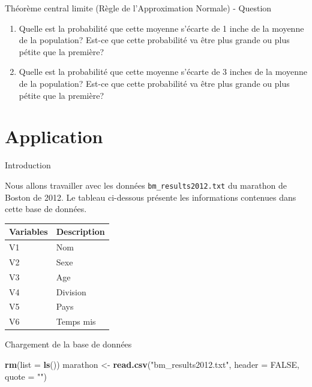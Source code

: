 \documentclass[ignorenonframetext,]{beamer}
\newenvironment{Shaded}{\begin{snugshade}}{\end{snugshade}}
\newcommand{\KeywordTok}[1]{\textcolor[rgb]{0.13,0.29,0.53}{\textbf{#1}}}
\newcommand{\DataTypeTok}[1]{\textcolor[rgb]{0.13,0.29,0.53}{#1}}
\newcommand{\StringTok}[1]{\textcolor[rgb]{0.31,0.60,0.02}{#1}}
\newcommand{\OtherTok}[1]{\textcolor[rgb]{0.56,0.35,0.01}{#1}}
\newcommand{\NormalTok}[1]{#1}
\providecommand{\tightlist}{%
  \setlength{\itemsep}{0pt}\setlength{\parskip}{0pt}}
\begin{document}
\begin{frame}{Théorème central limite (Règle de l'Approximation Normale)
- Question}

\begin{enumerate}
\def\labelenumi{\arabic{enumi}.}
\tightlist
\item
  Quelle est la probabilité que cette moyenne s'écarte de 1 inche de la
  moyenne de la population? Est-ce que cette probabilité va être plus
  grande ou plus pétite que la première?
\item
  Quelle est la probabilité que cette moyenne s'écarte de 3 inches de la
  moyenne de la population? Est-ce que cette probabilité va être plus
  grande ou plus pétite que la première?
\end{enumerate}

\end{frame}

\section{Application}\label{application}

\begin{frame}[fragile]{Introduction}

Nous allons travailler avec les données \texttt{bm\_results2012.txt} du
marathon de Boston de 2012. Le tableau ci-dessous présente les
informations contenues dans cette base de données.

\begin{longtable}[]{@{}ll@{}}
\toprule
Variables & Description\tabularnewline
\midrule
\endhead
V1 & Nom\tabularnewline
V2 & Sexe\tabularnewline
V3 & Age\tabularnewline
V4 & Division\tabularnewline
V5 & Pays\tabularnewline
V6 & Temps mis\tabularnewline
\bottomrule
\end{longtable}

\end{frame}

\begin{frame}[fragile]{Chargement de la base de données}

\begin{Shaded}
\begin{Highlighting}[]
\KeywordTok{rm}\NormalTok{(}\DataTypeTok{list =} \KeywordTok{ls}\NormalTok{())}
\NormalTok{marathon <-}\StringTok{ }\KeywordTok{read.csv}\NormalTok{(}\StringTok{"bm_results2012.txt"}\NormalTok{, }\DataTypeTok{header =} \OtherTok{FALSE}\NormalTok{, }\DataTypeTok{quote =} \StringTok{""}\NormalTok{)}
\end{Highlighting}
\end{Shaded}

\end{frame}
\end{document}
